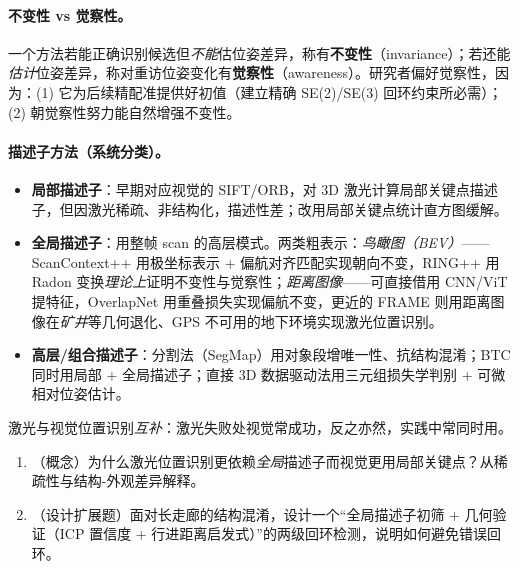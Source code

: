 \paragraph{不变性 vs 觉察性。}
一个方法若能正确识别候选但\emph{不能}估位姿差异，称有\textbf{不变性}（invariance）；若还能\emph{估计}位姿差异，称对重访位姿变化有\textbf{觉察性}（awareness）\cite{carlone2026handbook}。研究者偏好觉察性，因为：(1) 它为后续精配准提供好初值（建立精确 SE(2)/SE(3) 回环约束所必需）；(2) 朝觉察性努力能自然增强不变性。

\paragraph{描述子方法（系统分类）。}
\begin{itemize}
  \item \textbf{局部描述子}：早期对应视觉的 SIFT/ORB，对 3D 激光计算局部关键点描述子\cite{carlone2026handbook}，但因激光稀疏、非结构化，描述性差；改用局部关键点统计直方图缓解。
  \item \textbf{全局描述子}：用整帧 scan 的高层模式。两类粗表示：\emph{鸟瞰图（BEV）}——ScanContext++\cite{kim2018scancontext} 用极坐标表示 + 偏航对齐匹配实现朝向不变，RING++\cite{lu2023ringpp} 用 Radon 变换\emph{理论上}证明不变性与觉察性；\emph{距离图像}——可直接借用 CNN/ViT 提特征，OverlapNet\cite{chen2020overlapnet} 用重叠损失实现偏航不变，更近的 FRAME\cite{carlone2026handbook} 则用距离图像在\emph{矿井}等几何退化、GPS 不可用的地下环境实现激光位置识别。
  \item \textbf{高层/组合描述子}：分割法（SegMap\cite{dube2017segmap}）用对象段增唯一性、抗结构混淆；BTC 同时用局部 + 全局描述子；直接 3D 数据驱动法用三元组损失学判别 + 可微相对位姿估计\cite{carlone2026handbook}。
\end{itemize}
激光与视觉位置识别\emph{互补}：激光失败处视觉常成功，反之亦然，实践中常同时用。

\begin{practice}
\begin{enumerate}
  \item （概念）为什么激光位置识别更依赖\emph{全局}描述子而视觉更用局部关键点？从稀疏性与结构-外观差异解释。
  \item （设计扩展题）面对长走廊的结构混淆，设计一个“全局描述子初筛 + 几何验证（ICP 置信度 + 行进距离启发式）”的两级回环检测，说明如何避免错误回环。
\end{enumerate}
\end{practice}

